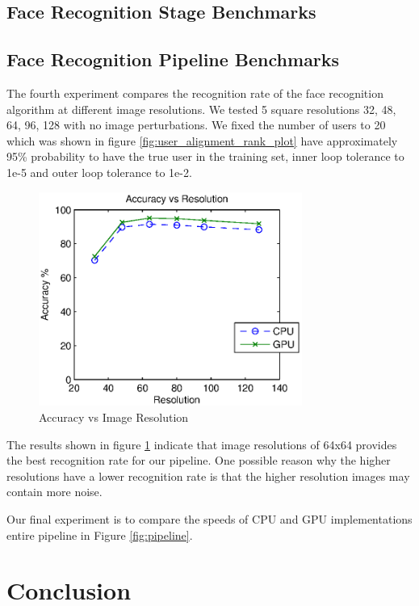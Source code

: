 \documentclass[10pt,twocolumn,letterpaper]{article}
\begin{document}
\subsection{Face Recognition Stage Benchmarks}
\label{sec:recognition_benchmark}

\subsection{Face Recognition Pipeline Benchmarks}
\label{sec:pipeline_benchmark}
The fourth experiment compares the recognition rate of the face recognition algorithm at different image resolutions.  We tested 5 square resolutions {32, 48, 64, 96, 128} with no image perturbations.  We fixed the number of users to 20 which was shown in figure \ref{fig:user_alignment_rank_plot} have approximately 95\% probability to have the true user in the training set, inner loop tolerance to 1e-5 and outer loop tolerance to 1e-2.  

\begin{figure}
\centering
\includegraphics[width=3.4in]{figures/accuracyVsResolution}
\caption{Accuracy vs Image Resolution}
\label{fig:accuracy_vs_resolution}
\end{figure}

The results shown in figure \ref{fig:accuracy_vs_resolution} indicate that
image resolutions of 64x64 provides the best recognition rate for our pipeline. One possible reason why the higher resolutions have a lower recognition rate is that the higher resolution images may contain more noise.

Our final experiment is to compare the speeds of CPU and GPU implementations entire pipeline in Figure \ref{fig:pipeline}.

\section{Conclusion}

{\small


}
\end{document}
